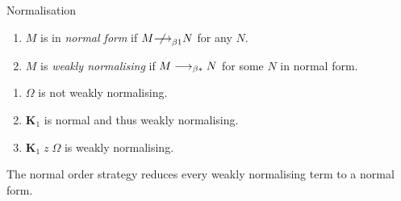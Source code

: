 \begin{frame}{Normalisation}
\begin{definition}
  \begin{enumerate}
    \item $M$ is in \emph{normal form} if $M \notonereduce N$ for any $N$. 
    \item $M$ is \emph{weakly normalising} if $M \longrightarrow_{\beta*} N$ for some $N$ in
      normal form.
  \end{enumerate}
\end{definition}
%
  \begin{enumerate}
    \item $\Omega$ is not weakly normalising.
    \item $\mathbf{K}_1$ is normal and thus weakly normalising.
    \item $\mathbf{K}_1\;z\; \Omega$ is weakly normalising.
  \end{enumerate}

\begin{theorem}
  The normal order strategy reduces every weakly
  normalising term to a normal form.
\end{theorem}

\end{frame}
%
%


%  
%   


